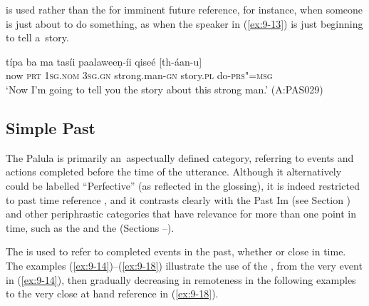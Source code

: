  is used rather than the  for imminent future reference, for instance, when someone is just about to do something, as when the speaker in (\ref{ex:9-13}) is just beginning to tell a~story.

\begin{exe}
\ex
\label{ex:9-13}
\gll típa ba ma tasíi paalaweeṇ-íi qiseé [th-áan-u] \\
now \textsc{prt} 1\textsc{sg.nom} 3\textsc{sg.gn} strong.man-\textsc{gn} story.\textsc{pl} do-\textsc{prs"=msg} \\
\glt `Now I'm going to tell you the story about this strong man.' (A:PAS029)
\end{exe}

\subsection{Simple Past}
\label{subsec:9-1-4}


The Palula  is primarily an~aspectually defined category, referring to events and actions completed before the time of the utterance. Although it alternatively could be labelled ``Perfective'' (as reflected in the glossing), it is indeed restricted to past time reference \citep[79]{dahl1985}, and it contrasts clearly with the Past Im (see Section ) and other periphrastic categories that have relevance for more than one point in time, such as the  and the  (Sections --).



The  is used to refer to completed events in the past, whether  or close in time. The examples (\ref{ex:9-14})--(\ref{ex:9-18}) illustrate the use of the , from the very  event in (\ref{ex:9-14}), then gradually decreasing in remoteness in the following examples to the very close at hand reference in (\ref{ex:9-18}).

